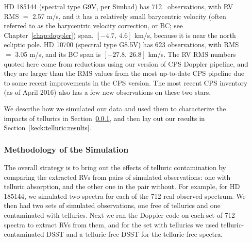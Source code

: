 HD 185144 (spectral type G9V, per Simbad) has 712 \keck\ observations,
with RV RMS $=$ 2.57 m/s, and it has a relatively small barycentric
velocity (often referred to as the barycentric velocity correction, or
BC; see Chapter~\ref{chap:doppler}) span, $[-4.7,\ 4.6]$ km/s, because
it is near the north ecliptic pole. HD 10700 (spectral type G8.5V) has
623 observations, with RMS $=$ 3.05 m/s, and its BC span is $[-27.8,\
26.8]$ km/s. The RV RMS numbers quoted here come from reductions using
our version of CPS Doppler pipeline, and they are larger than the RMS
values from the most up-to-date CPS pipeline due to some recent
improvements in the CPS version. The most recent CPS inventory (as of
April 2016) also has a few new observations on these two stars.

We describe how we simulated our data and used them to characterize
the impacts of tellurics in Section~\ref{keck:telluric:method}, and
then lay out our results in Section~\ref{keck:telluric:results}.


\subsubsection{Methodology of the Simulation}\label{keck:telluric:method}

The overall strategy is to bring out the effects of telluric
contamination by comparing the extracted RVs from pairs of simulated
observations: one with telluric absorption, and the other one in the
pair without. For example, for HD 185144, we simulated two spectra for
each of the 712 real observed spectrum. We then had two sets of
simulated observations, one free of tellurics and one contaminated
with tellurics. Next we ran the Doppler code on each set of 712
spectra to extract RVs from them, and for the set with tellurics we
used telluric-contaminated DSST and a telluric-free DSST for the
telluric-free spectra. \\

